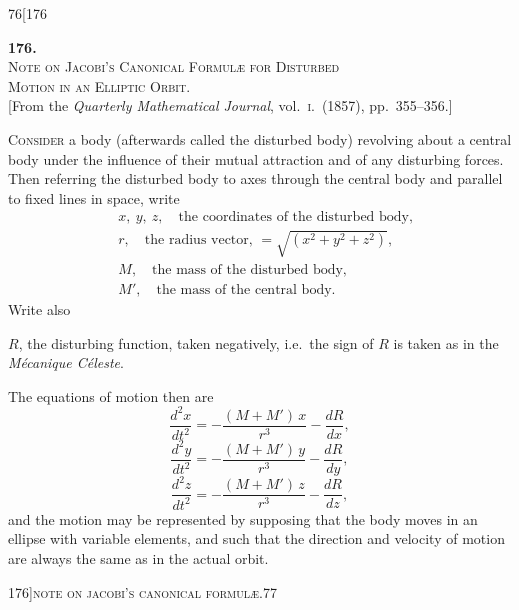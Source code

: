 \documentclass[11pt]{article}
\begin{document}
\newpage

\begin{center}
\small\textsc{76}\hfill\hfill[176
\end{center}

\vspace{4em}

\begin{center}
{\large\textbf{176.}}\\[1em]
{\large\scshape Note on Jacobi's Canonical Formul\ae{} for Disturbed\\ Motion in an Elliptic Orbit.}\\[1em]
{\small [From the \textit{Quarterly Mathematical Journal}, vol.~\textsc{i}.\ (1857), pp.~355--356.]}
\end{center}

\bigskip

\textsc{Consider} a body (afterwards called the disturbed body) revolving about a central
body under the influence of their mutual attraction and of any disturbing forces.
Then referring the disturbed body to axes through the central body and parallel to
fixed lines in space, write
\begin{align*}
& x,\ y,\ z,\quad\text{the coordinates of the disturbed body,}\\
& r, \quad\text{the radius vector, } = \sqrt{(x^{2} + y^{2} + z^{2})},\\
& M, \quad\text{the mass of the disturbed body,}\\
& M', \quad\text{the mass of the central body.}
\end{align*}
Write also

$R$, the disturbing function, taken negatively, i.e.\ the sign of $R$ is taken as in
the \emph{M\'ecanique C\'eleste}.

The equations of motion then are
\[
\frac{d^{2}x}{dt^{2}} = - \frac{(M + M')\,x}{r^{3}} - \frac{dR}{dx},
\]
\[
\frac{d^{2}y}{dt^{2}} = - \frac{(M + M')\,y}{r^{3}} - \frac{dR}{dy},
\]
\[
\frac{d^{2}z}{dt^{2}} = - \frac{(M + M')\,z}{r^{3}} - \frac{dR}{dz},
\]
and the motion may be represented by supposing that the body moves in an ellipse
with variable elements, and such that the direction and velocity of motion are always
the same as in the actual orbit.

\newpage

\begin{center}
\small 176]\hfill\textsc{note on jacobi's canonical formul\ae.}\hfill\textsc{77}
\end{center}
\end{document}

